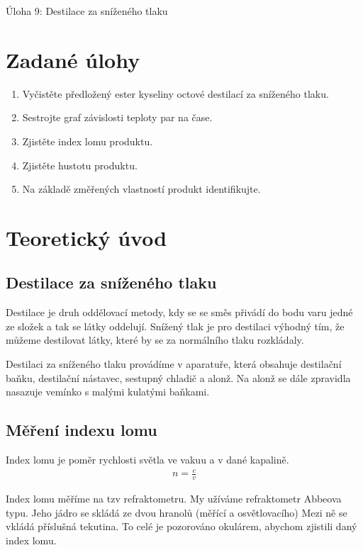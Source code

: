 \documentclass[13pt, a4paper, twoside]{article}
\begin{document}
\begin{center}
    \Huge
    Úloha 9: Destilace za sníženého tlaku
\end{center}
\large \onehalfspacing
\section*{Zadané úlohy}
\begin{enumerate}
    \item Vyčistěte předložený ester kyseliny octové destilací za sníženého tlaku.
    \item Sestrojte graf závislosti teploty par na čase.
    \item Zjistěte index lomu produktu.
    \item Zjistěte hustotu produktu.
    \item Na základě změřených vlastností produkt identifikujte.
    
\end{enumerate}
\section*{Teoretický úvod}
\subsection*{Destilace za sníženého tlaku}
Destilace je druh oddělovací metody, kdy se se směs přivádí do bodu varu jedné ze složek a tak se látky oddelují. Snížený tlak je pro destilaci výhodný tím, že můžeme destilovat látky, které by se za normálního tlaku rozkládaly.


Destilaci za sníženého tlaku provádíme v aparatuře, která obsahuje destilační baňku, destilační nástavec, sestupný chladič a alonž. Na alonž se dále zpravidla nasazuje vemínko s malými kulatými baňkami.

\subsection*{Měření indexu lomu}
Index lomu je poměr rychlosti světla ve vakuu a v dané kapalině.
\begin{align*}
    n = \frac{c}{v}
\end{align*}

Index lomu měříme na tzv refraktometru. My užíváme refraktometr Abbeova typu. Jeho jádro se skládá ze dvou hranolů (měřící a osvětlovacího) Mezi ně se vkládá příslušná tekutina. To celé je pozorováno okulárem, abychom zjistili daný index lomu.
\end{document}
